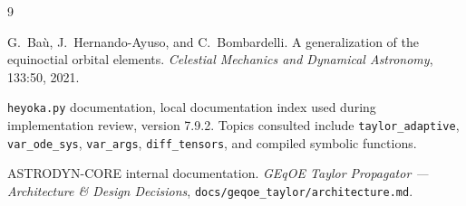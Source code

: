 \documentclass[11pt]{article}
\begin{document}
\begin{thebibliography}{9}

G.~Ba\`u, J.~Hernando-Ayuso, and C.~Bombardelli.
\newblock A generalization of the equinoctial orbital elements.
\newblock \emph{Celestial Mechanics and Dynamical Astronomy}, 133:50, 2021.

\texttt{heyoka.py} documentation, local documentation index used during
implementation review, version 7.9.2.
\newblock Topics consulted include \texttt{taylor\_adaptive},
\texttt{var\_ode\_sys}, \texttt{var\_args}, \texttt{diff\_tensors}, and
compiled symbolic functions.

ASTRODYN-CORE internal documentation.
\newblock \emph{GEqOE Taylor Propagator --- Architecture \& Design Decisions},
\texttt{docs/geqoe\_taylor/architecture.md}.

\end{thebibliography}
\end{document}
